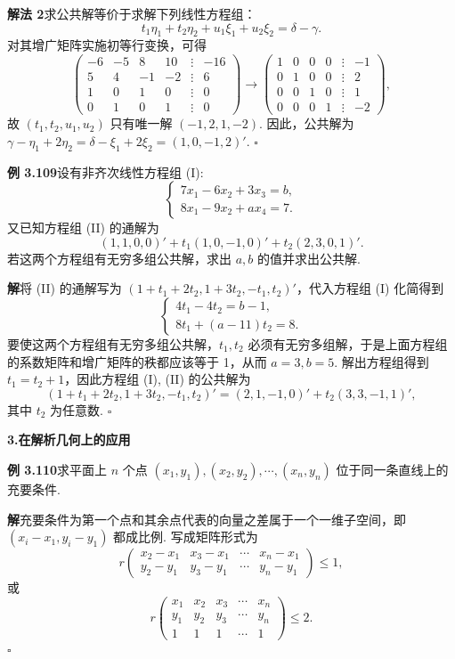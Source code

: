 \documentclass[UTF8,12pt,a4paper,fontset=fandol]{ctexart}
\begin{document}
\noindent\textbf{解法 2}\quad 求公共解等价于求解下列线性方程组：
\[
t_1\eta_1+t_2\eta_2+u_1\xi_1+u_2\xi_2=\delta-\gamma.
\]
对其增广矩阵实施初等行变换，可得
\[
\begin{pmatrix}
-6&-5&8&10&\vdots&-16\\
5&4&-1&-2&\vdots&6\\
1&0&1&0&\vdots&0\\
0&1&0&1&\vdots&0
\end{pmatrix}
\to
\begin{pmatrix}
1&0&0&0&\vdots&-1\\
0&1&0&0&\vdots&2\\
0&0&1&0&\vdots&1\\
0&0&0&1&\vdots&-2
\end{pmatrix},
\]
故 $(t_1,t_2,u_1,u_2)$ 只有唯一解 $(-1,2,1,-2)$. 因此，公共解为 $\gamma-\eta_1+2\eta_2=\delta-\xi_1+2\xi_2=(1,0,-1,2)'$. $\square$

\noindent\textbf{例 3.109}\quad 设有非齐次线性方程组 (I):
\[
\begin{cases}
7x_1-6x_2+3x_3=b,\\
8x_1-9x_2+ax_4=7.
\end{cases}
\]
又已知方程组 (II) 的通解为
\[
(1,1,0,0)'+t_1(1,0,-1,0)'+t_2(2,3,0,1)'.
\]
若这两个方程组有无穷多组公共解，求出 $a,b$ 的值并求出公共解.

\noindent\textbf{解}\quad 将 (II) 的通解写为 $(1+t_1+2t_2,1+3t_2,-t_1,t_2)'$，代入方程组 (I) 化简得到
\[
\begin{cases}
4t_1-4t_2=b-1,\\
8t_1+(a-11)t_2=8.
\end{cases}
\]
要使这两个方程组有无穷多组公共解，$t_1,t_2$ 必须有无穷多组解，于是上面方程组的系数矩阵和增广矩阵的秩都应该等于 1，从而 $a=3,b=5$. 解出方程组得到 $t_1=t_2+1$，因此方程组 (I), (II) 的公共解为
\[
(1+t_1+2t_2,1+3t_2,-t_1,t_2)'=(2,1,-1,0)'+t_2(3,3,-1,1)',
\]
其中 $t_2$ 为任意数. $\square$

\noindent\textbf{3.\quad 在解析几何上的应用}

\noindent\textbf{例 3.110}\quad 求平面上 $n$ 个点 $(x_1,y_1),(x_2,y_2),\cdots,(x_n,y_n)$ 位于同一条直线上的充要条件.

\noindent\textbf{解}\quad 充要条件为第一个点和其余点代表的向量之差属于一个一维子空间，即 $(x_i-x_1,y_i-y_1)$ 都成比例. 写成矩阵形式为
\[
r\begin{pmatrix}
x_2-x_1&x_3-x_1&\cdots&x_n-x_1\\
y_2-y_1&y_3-y_1&\cdots&y_n-y_1
\end{pmatrix}\le 1,
\]
或
\[
r\begin{pmatrix}
x_1&x_2&x_3&\cdots&x_n\\
y_1&y_2&y_3&\cdots&y_n\\
1&1&1&\cdots&1
\end{pmatrix}\le 2.
\]
$\square$
\end{document}
